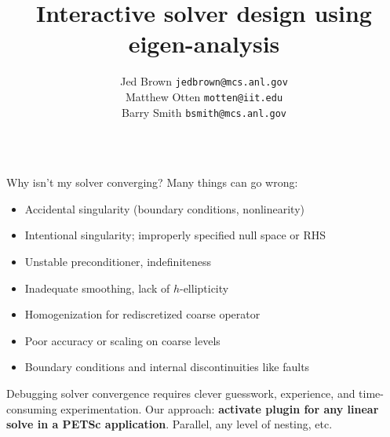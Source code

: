 \documentclass[final,t]{beamer}
\title{\LARGE Interactive solver design using eigen-analysis}
\author[Jed Brown]{Jed Brown {\texttt{jedbrown@mcs.anl.gov}} \\ Matthew Otten \texttt{motten@iit.edu} \\ Barry Smith \texttt{bsmith@mcs.anl.gov}}
\institute[MCS]{This poster: \url{http://59A2.org/files/20130807-Eigen.pdf}}
\begin{document}
\begin{frame}[fragile]{}
  \vspace{-3em}
  \begin{columns}
    \begin{column}{0.49\textwidth}
      \begin{block}{Why isn't my solver converging?}
        Many things can go wrong:
        \begin{itemize}
        \item Accidental singularity (boundary conditions, nonlinearity)
        \item Intentional singularity; improperly specified null space or RHS
        \item Unstable preconditioner, indefiniteness
        \item Inadequate smoothing, lack of $h$-ellipticity
        \item Homogenization for rediscretized coarse operator
        \item Poor accuracy or scaling on coarse levels
        \item Boundary conditions and internal discontinuities like faults
        \end{itemize}
        Debugging solver convergence requires clever guesswork, experience, and time-consuming experimentation.
        Our approach: {\bf activate plugin for any linear solve in a PETSc application}.  Parallel, any level of nesting, etc.
      \end{block}


\end{column}
\end{columns}
\end{frame}
\end{document}
